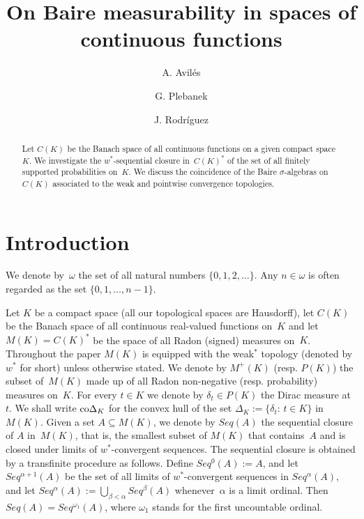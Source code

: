 \documentclass[12pt]{amsart}
\title{On Baire measurability in spaces of continuous functions}
\author{ A. Avil\'{e}s}
\author{G. Plebanek}
\author{J. Rodr\'{i}guez}
\newcommand{\sub}{\subseteq}
\newcommand{\0}{\protect{\bf 0}}
\newcommand{\1}{\protect{\bf 1}}
\theoremstyle{definition}
\theoremstyle{remark}
\numberwithin{equation}{section}
\begin{document}
\begin{abstract}
Let $C(K)$ be the Banach space of all continuous functions on a given compact space~$K$. 
We investigate the $w^*$-sequential closure in~$C(K)^*$ of the set of all finitely supported probabilities on~$K$. We
discuss the coincidence of the Baire $\sigma$-algebras on~$C(K)$ associated to the weak and pointwise convergence topologies. 
\end{abstract}

\maketitle


\section{Introduction}

We denote by~$\omega$ the set of all natural numbers $\{0,1,2,\dots\}$. 
Any $n \in \omega$ is often regarded as the set $\{0,1,\dots,n-1\}$.

Let $K$ be a compact space (all our topological spaces are Hausdorff), let $C(K)$ be
the Banach space of all continuous real-valued functions on~$K$ and let
$M(K)=C(K)^*$ be the space of all Radon (signed) measures on~$K$. Throughout the paper $M(K)$ 
is equipped with the weak$^*$ topology (denoted by $w^*$ for short) unless otherwise stated.
We denote by $M^+(K)$ (resp. $P(K)$) the subset of~$M(K)$ made up of all
Radon non-negative (resp. probability) measures on~$K$. For every $t\in K$ 
we denote by $\delta_t\in P(K)$ the Dirac measure at~$t$. We shall write 
${\rm co}\Delta_K$ for the convex hull 
of the set $\Delta_K := \{\delta_t: \, t\in K\}$ in $M(K)$.
Given a set $A\sub M(K)$, we denote by $Seq(A)$ the sequential closure of $A$ in~$M(K)$, 
that is, the smallest subset of $M(K)$ that contains~$A$ and is closed under limits of $w^*$-convergent sequences. 
The sequential closure is obtained by a transfinite procedure as follows. Define $Seq^0(A):=A$, and
let $Seq^{\alpha+1}(A)$ be the set of all limits of $w^*$-convergent sequences in 
$Seq^{\alpha}(A)$, and let $Seq^\alpha(A) := \bigcup_{\beta<\alpha}Seq^\beta(A)$ whenever~$\alpha$ is a limit ordinal. 
Then $Seq(A) = Seq^{\omega_1}(A)$, where $\omega_1$ stands for the first uncountable ordinal. 
\end{document}
